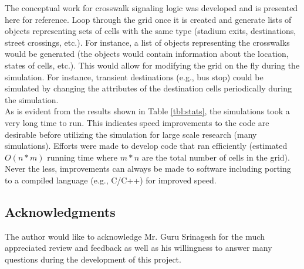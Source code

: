 \documentclass[paper=a4, fontsize=11pt]{scrartcl}
\numberwithin{equation}{section}		%
\numberwithin{figure}{section}			%
\numberwithin{table}{section}		    %
\begin{document}
\noindent
The conceptual work for crosswalk signaling logic was developed and is presented here for 
reference. Loop through the grid once it is created and generate lists of objects representing sets 
of cells with the same type (stadium exits, destinations, street crossings, etc.). For instance, a 
list of objects representing the crosswalks would be generated (the objects would contain 
information about the location, states of cells, etc.). This would allow for modifying the grid on 
the fly during the simulation. For instance, transient destinations (e.g., bus stop) could be 
simulated by changing the attributes of the destination cells periodically during the simulation.\\

\noindent
As is evident from the results shown in Table \ref{tbl:stats}, the simulations took a very long 
time to run. This indicates speed improvements to the code are desirable before utilizing the 
simulation for large scale research (many simulations). Efforts were made to develop code that ran 
efficiently (estimated $O(n*m)$ running time where $m*n$ are the total number of cells in the 
grid). Never the less, improvements can always be made to software including porting to a compiled 
language (e.g., C/C++) for improved speed.

\subsection{Acknowledgments}
The author would like to acknowledge Mr. Guru Srinagesh for the much appreciated review and 
feedback as well as his willingness to answer many questions during the development of this 
project. 
\end{document}
